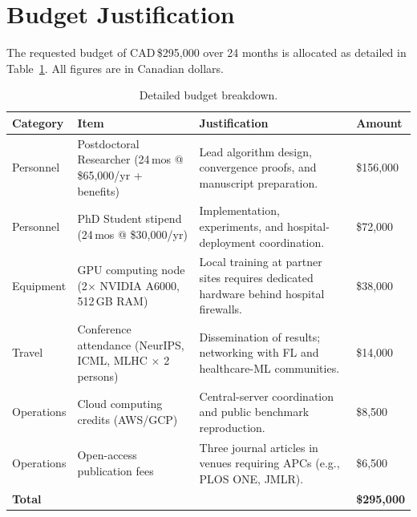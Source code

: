 \documentclass[11pt,a4paper]{article}
\newcommand{\budgetrow}[4]{%
  #1 & #2 & #3 & #4 \\[4pt]
}
\begin{document}
{%

\section{Budget Justification}

The requested budget of CAD\,\$295{,}000 over 24 months is allocated as detailed in
Table~\ref{tab:budget}. All figures are in Canadian dollars.

\begin{table}[htbp]
\centering
\caption{Detailed budget breakdown.}
\label{tab:budget}
\vspace{4pt}
\begin{tabularx}{\textwidth}{@{}>{\raggedright\arraybackslash}p{2.8cm}
                                >{\raggedright\arraybackslash}p{3.2cm}
                                >{\raggedright\arraybackslash}X
                                >{\raggedleft\arraybackslash}p{2cm}@{}}
\toprule
\rowcolor{accent!15}
\bfseries Category      & \bfseries Item                     & \bfseries Justification                              & \bfseries Amount \\
\midrule
\budgetrow{Personnel}
          {Postdoctoral Researcher (24\,mos @ \$65{,}000/yr + benefits)}
          {Lead algorithm design, convergence proofs, and manuscript preparation.}
          {\$156{,}000}
\addlinespace
\budgetrow{Personnel}
          {PhD Student stipend (24\,mos @ \$30{,}000/yr)}
          {Implementation, experiments, and hospital-deployment coordination.}
          {\$72{,}000}
\addlinespace
\budgetrow{Equipment}
          {GPU computing node (2$\times$ NVIDIA A6000, 512\,GB RAM)}
          {Local training at partner sites requires dedicated hardware behind hospital firewalls.}
          {\$38{,}000}
\addlinespace
\budgetrow{Travel}
          {Conference attendance (NeurIPS, ICML, MLHC $\times$ 2 persons)}
          {Dissemination of results; networking with FL and healthcare-ML communities.}
          {\$14{,}000}
\addlinespace
\budgetrow{Operations}
          {Cloud computing credits (AWS/GCP)}
          {Central-server coordination and public benchmark reproduction.}
          {\$8{,}500}
\addlinespace
\budgetrow{Operations}
          {Open-access publication fees}
          {Three journal articles in venues requiring APCs (e.g., PLOS ONE, JMLR).}
          {\$6{,}500}
\midrule
\rowcolor{accent!10}
\bfseries Total        &                                    &                                                     & \bfseries \$295{,}000 \\
\bottomrule
\end{tabularx}
\end{table}

}
\end{document}
